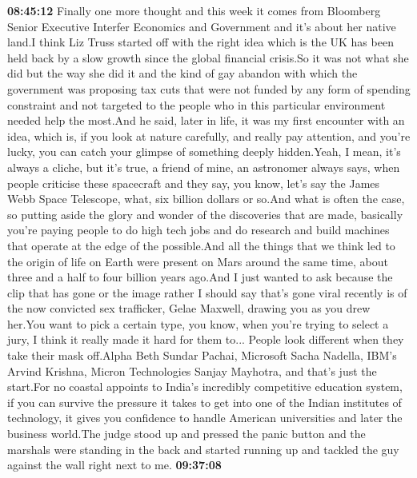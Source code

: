 \documentclass{article}%
\begin{document}
\textbf{08:45:12}%
Finally one more thought and this week it comes from Bloomberg Senior Executive Interfer Economics and Government and it's about her native land.I think Liz Truss started off with the right idea which is the UK has been held back by a slow growth since the global financial crisis.So it was not what she did but the way she did it and the kind of gay abandon with which the government was proposing tax cuts that were not funded by any form of spending constraint and not targeted to the people who in this particular environment needed help the most.And he said, later in life, it was my first encounter with an idea, which is, if you look at nature carefully, and really pay attention, and you're lucky, you can catch your glimpse of something deeply hidden.Yeah, I mean, it's always a cliche, but it's true, a friend of mine, an astronomer always says, when people criticise these spacecraft and they say, you know, let's say the James Webb Space Telescope, what, six billion dollars or so.And what is often the case, so putting aside the glory and wonder of the discoveries that are made, basically you're paying people to do high tech jobs and do research and build machines that operate at the edge of the possible.And all the things that we think led to the origin of life on Earth were present on Mars around the same time, about three and a half to four billion years ago.And I just wanted to ask because the clip that has gone or the image rather I should say that's gone viral recently is of the now convicted sex trafficker, Gelae Maxwell, drawing you as you drew her.You want to pick a certain type, you know, when you're trying to select a jury, I think it really made it hard for them to... People look different when they take their mask off.Alpha Beth Sundar Pachai, Microsoft Sacha Nadella, IBM's Arvind Krishna, Micron Technologies Sanjay Mayhotra, and that's just the start.For no coastal appoints to India's incredibly competitive education system, if you can survive the pressure it takes to get into one of the Indian institutes of technology, it gives you confidence to handle American universities and later the business world.The judge stood up and pressed the panic button and the marshals were standing in the back and started running up and tackled the guy against the wall right next to me.%
\textbf{09:37:08}%
\end{document}
